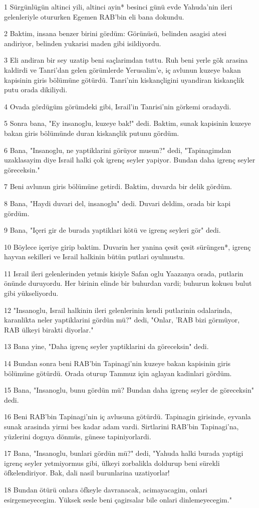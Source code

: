 \par 1 Sürgünlügün altinci yili, altinci ayin* besinci günü evde Yahuda'nin ileri gelenleriyle otururken Egemen RAB'bin eli bana dokundu.
\par 2 Baktim, insana benzer birini gördüm: Görünüsü, belinden asagisi atesi andiriyor, belinden yukarisi maden gibi isildiyordu.
\par 3 Eli andiran bir sey uzatip beni saçlarimdan tuttu. Ruh beni yerle gök arasina kaldirdi ve Tanri'dan gelen görümlerde Yerusalim'e, iç avlunun kuzeye bakan kapisinin giris bölümüne götürdü. Tanri'nin kiskançligini uyandiran kiskançlik putu orada dikiliydi.
\par 4 Ovada gördügüm görümdeki gibi, Israil'in Tanrisi'nin görkemi oradaydi.
\par 5 Sonra bana, "Ey insanoglu, kuzeye bak!" dedi. Baktim, sunak kapisinin kuzeye bakan giris bölümünde duran kiskançlik putunu gördüm.
\par 6 Bana, "Insanoglu, ne yaptiklarini görüyor musun?" dedi, "Tapinagimdan uzaklasayim diye Israil halki çok igrenç seyler yapiyor. Bundan daha igrenç seyler göreceksin."
\par 7 Beni avlunun giris bölümüne getirdi. Baktim, duvarda bir delik gördüm.
\par 8 Bana, "Haydi duvari del, insanoglu" dedi. Duvari deldim, orada bir kapi gördüm.
\par 9 Bana, "Içeri gir de burada yaptiklari kötü ve igrenç seyleri gör" dedi.
\par 10 Böylece içeriye girip baktim. Duvarin her yanina çesit çesit sürüngen*, igrenç hayvan sekilleri ve Israil halkinin bütün putlari oyulmustu.
\par 11 Israil ileri gelenlerinden yetmis kisiyle Safan oglu Yaazanya orada, putlarin önünde duruyordu. Her birinin elinde bir buhurdan vardi; buhurun kokusu bulut gibi yükseliyordu.
\par 12 "Insanoglu, Israil halkinin ileri gelenlerinin kendi putlarinin odalarinda, karanlikta neler yaptiklarini gördün mü?" dedi, "Onlar, 'RAB bizi görmüyor, RAB ülkeyi birakti diyorlar."
\par 13 Bana yine, "Daha igrenç seyler yaptiklarini da göreceksin" dedi.
\par 14 Bundan sonra beni RAB'bin Tapinagi'nin kuzeye bakan kapisinin giris bölümüne götürdü. Orada oturup Tammuz için aglayan kadinlari gördüm.
\par 15 Bana, "Insanoglu, bunu gördün mü? Bundan daha igrenç seyler de göreceksin" dedi.
\par 16 Beni RAB'bin Tapinagi'nin iç avlusuna götürdü. Tapinagin girisinde, eyvanla sunak arasinda yirmi bes kadar adam vardi. Sirtlarini RAB'bin Tapinagi'na, yüzlerini doguya dönmüs, günese tapiniyorlardi.
\par 17 Bana, "Insanoglu, bunlari gördün mü?" dedi, "Yahuda halki burada yaptigi igrenç seyler yetmiyormus gibi, ülkeyi zorbalikla doldurup beni sürekli öfkelendiriyor. Bak, dali nasil burunlarina uzatiyorlar!
\par 18 Bundan ötürü onlara öfkeyle davranacak, acimayacagim, onlari esirgemeyecegim. Yüksek sesle beni çagirsalar bile onlari dinlemeyecegim."

